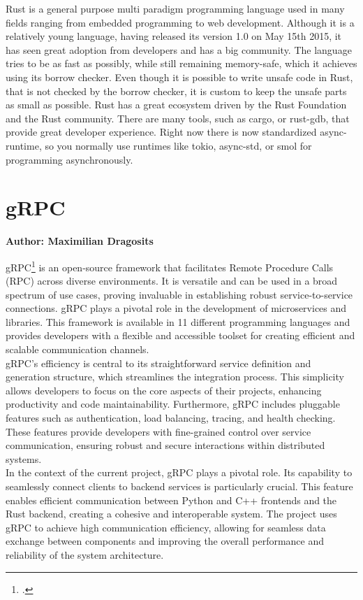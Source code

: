 Rust is a general purpose multi paradigm programming language used in many fields ranging from embedded programming to web development. Although it is a relatively young language, having released its version 1.0 on May 15th 2015, it has seen great adoption from developers and has a big community. The language tries to be as fast as possibly, while still remaining memory-safe, which it achieves using its borrow checker. Even though it is possible to write unsafe code in Rust, that is not checked by the borrow checker, it is custom to keep the unsafe parts as small as possible.
Rust has a great ecosystem driven by the Rust Foundation and the Rust community. There are many tools, such as cargo, or rust-gdb, that provide great developer experience.
Right now there is now standardized async-runtime, so you normally use runtimes like tokio, async-std, or smol for programming asynchronously.

\section{gRPC}
\textbf{Author: Maximilian Dragosits}

gRPC\footcite{grpc_main_site} is an open-source framework that facilitates Remote Procedure Calls (RPC) across diverse environments. It is versatile 
and can be used in a broad spectrum of use cases, proving invaluable in establishing robust service-to-service connections. gRPC plays a pivotal role in the 
development of microservices and libraries. This framework is available in 11 different programming languages and provides developers with a flexible 
and accessible toolset for creating efficient and scalable communication channels.\\

gRPC's efficiency is central to its straightforward service definition and generation structure, which streamlines the integration process. 
This simplicity allows developers to focus on the core aspects of their projects, enhancing productivity and code maintainability. Furthermore, gRPC includes 
pluggable features such as authentication, load balancing, tracing, and health checking. These features provide developers with fine-grained control over 
service communication, ensuring robust and secure interactions within distributed systems.\\

In the context of the current project, gRPC plays a pivotal role. Its capability to seamlessly connect clients to backend services is particularly crucial. 
This feature enables efficient communication between Python and C++ frontends and the Rust backend, creating a cohesive and interoperable system. The project 
uses gRPC to achieve high communication efficiency, allowing for seamless data exchange between components and improving the overall performance and reliability 
of the system architecture.

